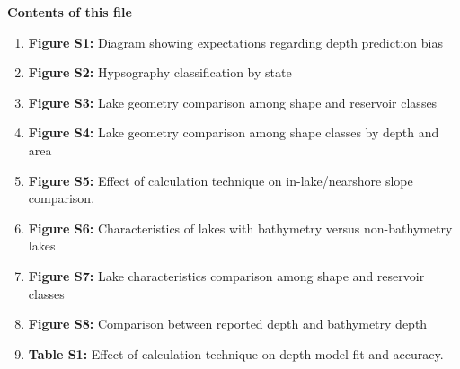 \documentclass[draft,wrr]{agutexSI2019}
\begin{document}
\begin{article}




      \noindent\textbf{Contents of this file}
      \begin{enumerate}

            \item \textbf{Figure S1:} Diagram showing expectations regarding depth prediction bias

            \item \textbf{Figure S2:} Hypsography classification by state

            \item \textbf{Figure S3:} Lake geometry comparison among shape and reservoir classes

            \item \textbf{Figure S4:} Lake geometry comparison among shape classes by depth and area

            \item \textbf{Figure S5:} Effect of calculation technique on in-lake/nearshore slope comparison.

            \item \textbf{Figure S6:} Characteristics of lakes with bathymetry versus non-bathymetry lakes

            \item \textbf{Figure S7:} Lake characteristics comparison among shape and reservoir classes

            \item \textbf{Figure S8:} Comparison between reported depth and bathymetry depth

            \item \textbf{Table S1:} Effect of calculation technique on depth model fit and accuracy.

      \end{enumerate}
      \vspace{1em}



\end{article}
\end{document}
